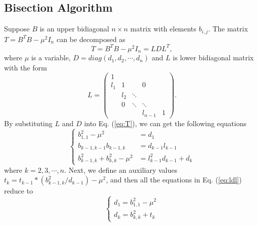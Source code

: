 \subsection{Bisection Algorithm}\label{subsec:bisection}
Suppose $B$ is an upper bidiagonal $n \times n$ matrix with elements $b_{i,j}$.
The matrix $T = B^T B - \mu^2 I_n$ can be decomposed as
\begin{equation}
T = B^T B - \mu^2 I_n = L D L^T ,
\label{eq:T}
\end{equation}
where $\mu$ is a variable, $D=diag(d_1,d_2,\cdots,d_n)$ and $L$ is lower bidiagonal matrix with the form 
\begin{equation}
 L =  \left( \begin{array}{ccccc}
     1&      &       &        &  \\
 l_{1}& 1    &       & 0      &  \\
      & l_{2}& \ddots&        &  \\
      & 0    & \ddots& \ddots &  \\
      &      &       & l_{n-1}& 1
\end{array} \right) .
\label{eq:l}
\end{equation}
By substituting $L$ and $D$ into Eq. (\ref{eq:T}), we can get the following equations
\begin{equation}
\left \{ \begin{aligned}
b_{1,1}^2 - \mu^2 &= d_1\\
b_{k-1,k-1} b_{k-1,k} &= d_{k-1} l_{k-1}\\
b_{k-1,k}^2 + b_{k,k}^2 - \mu^2 &= l_{k-1}^2 d_{k-1} + d_k
\end{aligned} \right .
\label{eq:ldl}
\end{equation}
where $k = 2,3,\cdots,n$.
Next, we define an auxiliary values $t_{k} = t_{k-1} * (b_{k-1,k}^2 / d_{k-1}) - \mu^2$, and then all the equations in Eq. (\ref{eq:ldl}) reduce to
\begin{equation}
\left \{
\begin{aligned}
d_1 = b_{1,1}^2 - \mu^2 \\
d_k = b_{k,k}^2 + t_{k}
\end{aligned}
\right .
\label{eq:negcount}
\end{equation}

